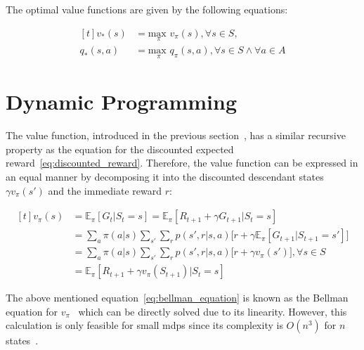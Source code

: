 \documentclass[draft,final]{vutinfth} %
\begin{document}
    The optimal value functions are given by the following equations:

    \begin{equation}
        \begin{aligned}[t]
            v_*(s) &= \underset{\pi}{\text{max }}v_\pi(s), \forall s \in \mathit{S}, \\
            q_*(s,a) &= \underset{\pi}{\text{max }}q_\pi(s,a), \forall s \in \mathit{S} \land \forall a \in \mathit{A}\label{eq:optimal}
        \end{aligned}
    \end{equation}


    \section{Dynamic Programming}

    The value function, introduced in the previous section~, has a similar recursive property as the equation for the discounted expected reward~\eqref{eq:discounted_reward}.
    Therefore, the value function can be expressed in an equal manner by decomposing it into the discounted descendant states $\gamma v_\pi(s')$ and the immediate reward $r$:

    \begin{equation}
        \begin{aligned}[t]
            v_\pi(s) &= \mathbb{E}_\pi[G_t|S_t=s] = \mathbb{E}_\pi[R_{t+1} + \gamma G_{t+1}|S_t=s] \\
            &  =  \sum_{a} \pi(a|s) \sum_{s'}\sum_{r} p(s',r|s,a) \bigg[r + \gamma \mathbb{E}_\pi[G_{t+1}|S_{t+1} = s'] \bigg] \\
            &  =  \sum_{a} \pi(a|s) \sum_{s'}\sum_{r} p(s',r|s,a) \bigg[r + \gamma v_{\pi}(s') \bigg], \forall s \in \mathit{S} \\
            &  =  \mathbb{E}_\pi[R_{t+1} + \gamma v_\pi(S_{t+1})|S_t=s]
            \label{eq:bellman_equation}
        \end{aligned}
    \end{equation}

    The above mentioned equation~\eqref{eq:bellman_equation} is known as the Bellman equation for $v_\pi$~\citep{sutton_reinforcement_2018} which can be directly solved due to its linearity.
    However, this calculation is only feasible for small \gls{mdp}s since its complexity is $O(n^3)$ for $n$ states~\citep{silver_lecture_2015-1}.
\end{document}
